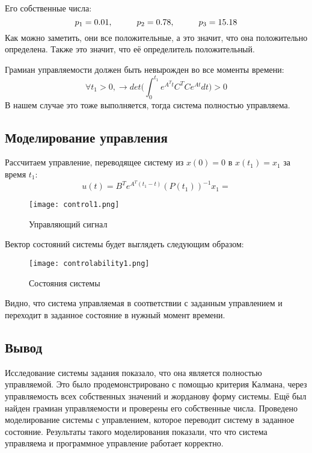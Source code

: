 Его собственные числа:
$$
    p_{1} = 0.01 , \hspace*{1cm} p_{2} = 0.78, \hspace*{1cm} p_3 = 15.18
$$
Как можно заметить, они все положительные, а это значит, что она положительно определена. 
Также это значит, что её определитель положительный.

Грамиан управляемости должен быть невырожден во все моменты времени:
$$
\forall t_1 > 0, \rightarrow det\bigg( \int_{0}^{t_1}e^{A^Tt}C^TCe^{At}dt \bigg) > 0
$$
В нашем случае это тоже выполняется, тогда система полностью управляема.

\subsection{Моделирование управления}

Рассчитаем управление, переводящее систему из $x(0) = 0$ в $x(t_1) = x_1$ за время $t_1$:
$$
    u(t) = B^T e^{A^T(t_1 - t)}(P(t_1))^{-1}x_1 = 
$$
\begin{figure}[ht]
    \centering
    \texttt{[image: control1.png]}
    \caption{Управляющий сигнал}
\end{figure}

Вектор состояний системы будет выглядеть следующим образом:
\begin{figure}[ht]
  \centering
  \texttt{[image: controlability1.png]}
  \caption{Состояния системы}
\end{figure}

Видно, что система управляемая в соответствии с заданным управлением и переходит в заданное состояние в нужный момент времени.

\subsection{Вывод}

Исследование системы задания показало, что она является полностью управляемой. 
Это было продемонстрировано с помощью критерия Калмана, через управляемость всех собственных значений и жорданову форму системы.
Ещё был найден грамиан управляемости и проверены его собственные числа. 
Проведено моделирование системы с управлением, которое переводит систему в заданное состояние. Результаты такого моделирования показали,
что что система управляема и программное управление работает корректно.
\endinput